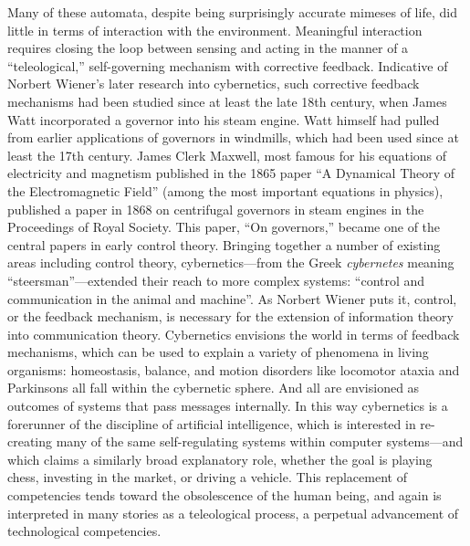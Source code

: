 Many of these automata, despite being surprisingly accurate
mimeses of life, did little in terms of interaction with the
environment. Meaningful interaction requires closing the loop between
sensing and acting in the manner of a
 ``teleological,'' self-governing mechanism with corrective feedback.
 Indicative of Norbert Wiener's later research into cybernetics, such
 corrective feedback mechanisms had been studied since at least the
 late 18th century, when James Watt incorporated a governor into his
 steam engine. Watt himself had pulled from earlier applications of
 governors in windmills, which had been used since at least the 17th
 century.\cite{richardhills} James Clerk Maxwell, most famous for his equations of
 electricity and magnetism published in the 1865 paper ``A Dynamical
 Theory of the Electromagnetic Field'' (among the most important
 equations in physics), published a paper in 1868 on centrifugal
 governors in steam engines in the Proceedings of Royal Society. This
 paper, ``On governors,'' became one of the central papers in early
 control theory.\cite{ottomayr} Bringing together a number of existing
 areas including control theory,
 cybernetics---from the Greek \emph{cybernetes} meaning
 ``steersman''\cite[p. 6]{wienerMainIdeas}---extended their reach to more complex
 systems: ``control and communication in the animal and machine''. As
 Norbert Wiener puts it, control, or the
 feedback mechanism, is necessary for the extension of information
 theory into communication theory. Cybernetics envisions the world in
 terms of feedback mechanisms, which can be used to explain a variety
 of phenomena in living organisms: homeostasis, balance, and motion
 disorders like locomotor ataxia and Parkinsons all fall within the
 cybernetic sphere\cite[p. 10-15]{wienerMainIdeas}. And all are envisioned
 as outcomes of systems that pass messages internally. In this way
 cybernetics is a forerunner of the discipline of
 artificial intelligence, which is interested in re-creating many of the same
 self-regulating systems within computer systems---and which claims a
 similarly broad explanatory role, whether the goal is playing chess,
 investing in the market, or driving a vehicle. This replacement of
 competencies tends toward the obsolescence of the human being, and
 again is interpreted in many stories as a teleological process, a
 perpetual advancement of technological competencies.

